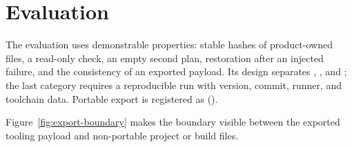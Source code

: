 \section{Evaluation}
\label{chap:evaluation}

The evaluation uses demonstrable properties: stable hashes of product-owned files, a
read-only check, an empty second plan, restoration after an injected failure, and the
consistency of an exported payload. Its design separates \Implemented{}, \Verified{},
and \Measured{}; the last category requires a reproducible run with version, commit,
runner, and toolchain data. Portable export is registered as \Verified{}
().

Figure~\ref{fig:export-boundary} makes the boundary visible between the exported
tooling payload and non-portable project or build files.

